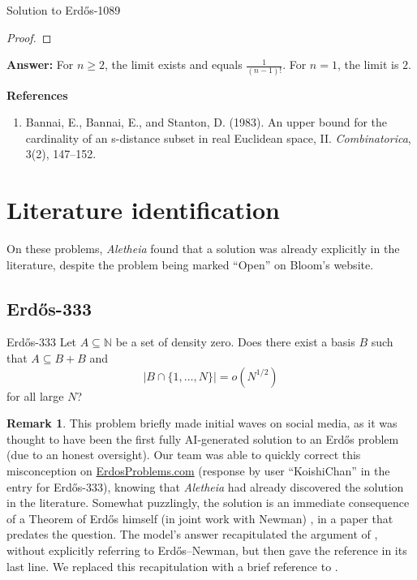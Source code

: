 \documentclass{article}
\theoremstyle{plain}
\theoremstyle{definition}
\newtheorem{remark}{Remark}[section]
\newcommand{\Aletheia}{\emph{Aletheia}}
\begin{document}
\begin{solution}{Solution to Erdős-1089}
\begin{proof}
\end{proof}

\textbf{Answer:}
For $n \ge 2$, the limit exists and equals $\frac{1}{(n-1)!}$.
For $n=1$, the limit is $2$.

\medskip
\textbf{References}
\begin{enumerate}
    \item \cite{BBS83} Bannai, E., Bannai, E., and Stanton, D. (1983). An upper bound for the cardinality of an s-distance subset in real Euclidean space, II. \textit{Combinatorica}, 3(2), 147–152.
\end{enumerate}
\end{solution}

\section{Literature identification}\label{sec:literature-identification} On these problems, {\Aletheia} found that a solution was already explicitly in the literature, despite the problem being marked ``Open'' on Bloom's website.



\subsection{Erdős-333}

\begin{problem}{Erdős-333 \cite{ErGr80}}
    Let $A\subseteq \mathbb{N}$ be a set of density zero. Does there exist a basis $B$ such that $A\subseteq B+B$ and\[\lvert B\cap \{1,\ldots,N\}\rvert =o(N^{1/2})\]for all large $N$?
\end{problem}

\begin{remark}
    This problem briefly made initial waves on social media, as it was thought to have been the first fully AI-generated solution to an Erd\H{o}s problem (due to an honest oversight). Our team was able to quickly correct this misconception on \href{https://www.erdosproblems.com/}{\ttfamily ErdosProblems.com} (response by user ``KoishiChan'' in the entry for Erdős-333), knowing that {\Aletheia} had already discovered the solution in the literature. Somewhat puzzlingly, the solution is an immediate consequence of a Theorem of Erd\H{o}s himself (in joint work with Newman) \cite{EN77}, in a paper that predates the question. The model's answer recapitulated the argument of \cite{EN77}, without explicitly referring to Erd\H{o}s--Newman, but then gave the reference \cite{EN77} in its last line. We replaced this recapitulation with a brief reference to \cite{EN77}.
\end{remark}
\end{document}
